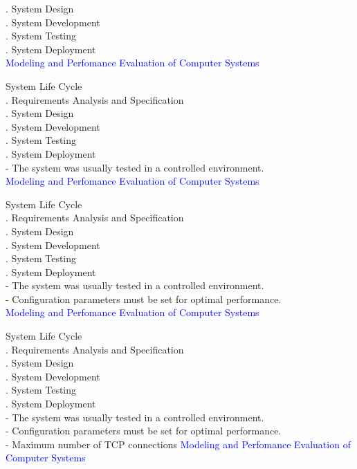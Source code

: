 \documentclass[svgnames]{beamer}
\begin{document}
. System Design\\
. System Development\\
. System Testing\\
. System Deployment\\[14pt]
\newpage
\textcolor{blue}{Modeling and Perfomance Evaluation of Computer Systems} \\[38pt]
\raggedright
\! System Life Cycle\\
. Requirements Analysis and Specification\\
. System Design\\
. System Development\\
. System Testing\\
. System Deployment\\[14pt]
 - The system was usually tested in a controlled environment.\\
\newpage
\textcolor{blue}{Modeling and Perfomance Evaluation of Computer Systems} \\[38pt]
\raggedright
\! System Life Cycle\\
. Requirements Analysis and Specification\\
. System Design\\
. System Development\\
. System Testing\\
. System Deployment\\[14pt]
 - The system was usually tested in a controlled environment.\\
 - Configuration parameters must be set for optimal performance.\\
\newpage
\textcolor{blue}{Modeling and Perfomance Evaluation of Computer Systems} \\[38pt]
\raggedright
\! System Life Cycle\\
. Requirements Analysis and Specification\\
. System Design\\
. System Development\\
. System Testing\\
. System Deployment\\[14pt]
 - The system was usually tested in a controlled environment.\\
 - Configuration parameters must be set for optimal performance.\\
 - Maximum number of TCP connections
\newpage
\textcolor{blue}{Modeling and Perfomance Evaluation of Computer Systems} \\[38pt]
\end{document}

